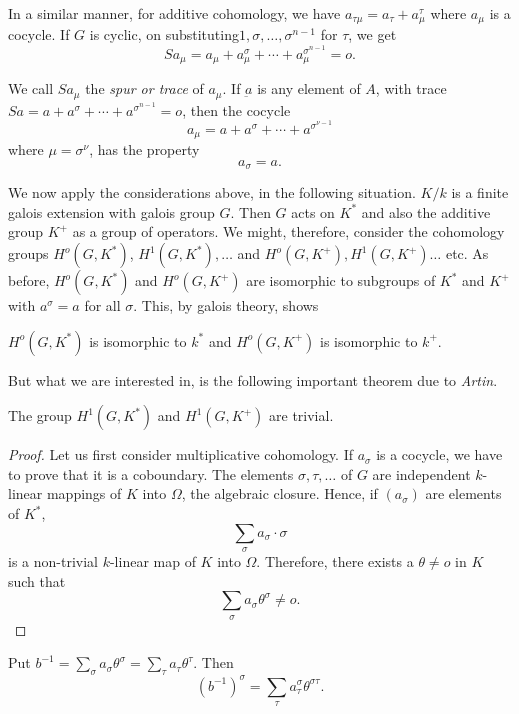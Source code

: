  In a similar manner, for additive cohomology, we have $a_{\tau
   \mu}=a_\tau + a^\tau_\mu $ where $a_\mu$ is a cocycle. If $G$ is
 cyclic, on substituting\pageoriginale $1,\sigma,\ldots,\sigma^{n-1}$
 for $\tau$, we  get  
 $$
 S a_{\mu} =a_\mu +a^\sigma_\mu + \cdots + a^{\sigma^{n-1}}_\mu =o.
 $$
 
 We call $S a_\mu$ the \textit{spur or trace} of $a_\mu$. If
 $\underbar{a}$ is any element of $A$, with trace $S a=a+a^\sigma +
 \cdots + a^{\sigma^{n-1}}=o$, then the cocycle  
 $$
 a_\mu = a+a^\sigma +\cdots +a^{\sigma^{\nu -1}}
 $$
 where $\mu = \sigma^\nu$, has the property
 $$
 a_\sigma = a.
 $$
 
 We now apply the considerations above, in the following
 situation. $K/k$ is a finite galois extension with galois group
 $G$. Then $G$ acts on $K^*$ and also the additive group $K^+$ as a
 group of operators. We might, therefore, consider the cohomology
 groups $H^o(G,K^*)$, $H^1(G,K^*),\ldots $ and
 $H^o(G,K^+),H^1(G,K^+)\ldots $ etc. As before, $H^o(G,K^*)$ and
 $H^o(G,K^+)$ are isomorphic to subgroups of $K^*$ and $K^+$ with
 $a^\sigma = a $ for all $\sigma$. This, by galois theory, shows 

 \begin{thm}\label{c6:thm6} %
$H^o (G,K^*)$ is isomorphic to $k^*$ and $H^o(G,K^+)$ is
     isomorphic to $k^+$. 
 \end{thm} 
 
 But what we are interested in, is the following important theorem due
 to \textit{Artin}. 

 \begin{thm}\label{c6:thm7} %
 The group $H^1 (G,K^*)$ and $H^1 (G,K^+)$ are trivial.
 \end{thm} 

 \begin{proof} %
Let us first consider multiplicative cohomology. If $a_\sigma$ is a
cocycle, we have to prove that it is a coboundary. The elements
$\sigma,\tau ,\ldots$ of $G$ are independent $k$-linear mappings of
$K$ into $\Omega$, the algebraic closure. Hence, if $(a_\sigma)$ are
elements of $K^*$, 
$$
\sum_\sigma a_\sigma  \cdot \sigma 
$$\pageoriginale
is a non-trivial $k$-linear map of $K$ into $\Omega$. Therefore, there
exists a $\theta \neq o$ in $K$ such that 
$$
\sum_\sigma a_\sigma \theta^\sigma \neq o.
$$
\end{proof} 

Put $b^{-1}=\sum\limits_\sigma a_\sigma \theta^\sigma = \sum
\limits_\tau a_\tau \theta^\tau$. Then 
$$
(b^{-1})^\sigma = \sum_\tau a^\sigma_\tau \theta^{\sigma \tau}.
$$

